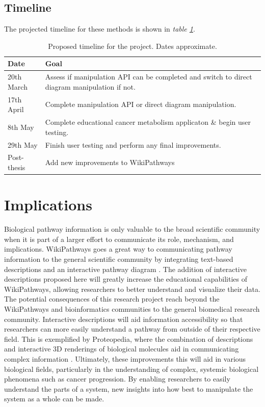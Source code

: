 \documentclass[a4paper,12pt,twoside]{apa}
\begin{document}
\clearpage

\FloatBarrier
\subsection{Timeline}
The projected timeline for these methods is shown in \textit{table \ref{tbl:timeline}}.
\begin{table}[h]
  \centering
  \caption{Proposed timeline for the project. Dates approximate.}
  \label{tbl:timeline}
  \begin{tabularx}{0.9\textwidth}{|X|X|}
    \hline
    \textbf{Date} & \textbf{Goal} \\ \hline
    20th March & Assess if manipulation API can be completed and switch to direct diagram manipulation if not. \\ \hline
    17th April & Complete manipulation API or direct diagram manipulation. \\ \hline
    8th May & Complete educational cancer metabolism applicaton \& begin user testing. \\ \hline
    29th May & Finish user testing and perform any final improvements. \\ \hline
    Post-thesis & Add new improvements to WikiPathways \\ \hline
  \end{tabularx}
\end{table}

\section{Implications}

Biological pathway information is only valuable to the broad scientific community when it is part of a larger effort to communicate its role, mechanism, and implications. WikiPathways goes a great way to communicating pathway information to the general scientific community by integrating text-based descriptions and an interactive pathway diagram \cite{pico2008wikipathways}. The addition of interactive descriptions proposed here will greatly increase the educational capabilities of WikiPathways, allowing researchers to better understand and visualize their data. The potential consequences of this research project reach beyond the WikiPathways and bioinformatics communities to the general biomedical research community. Interactive descriptions will aid information accessibility so that researchers can more easily understand a pathway from outside of their respective field. This is exemplified by Proteopedia, where the combination of descriptions and interactive 3D renderings of biological molecules aid in communicating complex information \cite{hodis2008proteopedia}.  Ultimately, these improvements this will aid in various biological fields, particularly in the understanding of complex, systemic biological phenomena such as cancer progression. By enabling researchers to easily understand the parts of a system, new insights into how best to manipulate the system as a whole can be made.



\end{document}
